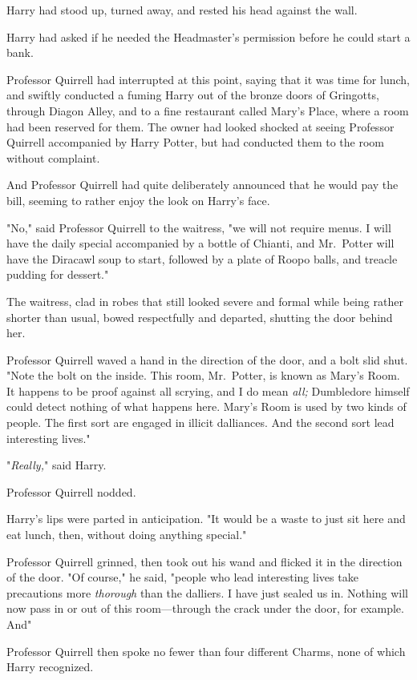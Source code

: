 Harry had stood up, turned away, and rested his head against the wall.

Harry had asked if he needed the Headmaster's permission before he could start
a bank.

Professor Quirrell had interrupted at this point, saying that it was time for
lunch, and swiftly conducted a fuming Harry out of the bronze doors of
Gringotts, through Diagon Alley, and to a fine restaurant called Mary's Place,
where a room had been reserved for them. The owner had looked shocked at seeing
Professor Quirrell accompanied by Harry Potter, but had conducted them to the
room without complaint.

And Professor Quirrell had quite deliberately announced that he would pay the
bill, seeming to rather enjoy the look on Harry's face.

"No," said Professor Quirrell to the waitress, "we will not require menus. I
will have the daily special accompanied by a bottle of Chianti, and Mr.~Potter
will have the Diracawl soup to start, followed by a plate of Roopo balls, and
treacle pudding for dessert."

The waitress, clad in robes that still looked severe and formal while being
rather shorter than usual, bowed respectfully and departed, shutting the door
behind her.

Professor Quirrell waved a hand in the direction of the door, and a bolt slid
shut. "Note the bolt on the inside. This room, Mr.~Potter, is known as Mary's
Room. It happens to be proof against all scrying, and I do mean \emph{all;}
Dumbledore himself could detect nothing of what happens here. Mary's Room is
used by two kinds of people. The first sort are engaged in illicit dalliances.
And the second sort lead interesting lives."

"\emph{Really,}" said Harry.

Professor Quirrell nodded.

Harry's lips were parted in anticipation. "It would be a waste to just sit here
and eat lunch, then, without doing anything special."

Professor Quirrell grinned, then took out his wand and flicked it in the
direction of the door. "Of course," he said, "people who lead interesting lives
take precautions more \emph{thorough} than the dalliers. I have just sealed us
in. Nothing will now pass in or out of this room---through the crack under the
door, for example. And{\el}"

Professor Quirrell then spoke no fewer than four different Charms, none of
which Harry recognized.

